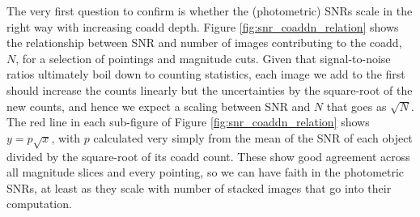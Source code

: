 \documentclass[SE,lsstdraft,authoryear,toc]{lsstdoc}
\begin{document}
The very first question to confirm is whether the (photometric) SNRs scale in the right way with increasing coadd depth.
Figure \ref{fig:snr_coaddn_relation} shows the relationship between SNR and number of images contributing to the coadd, $N$, for a selection of pointings and magnitude cuts.
Given that signal-to-noise ratios ultimately boil down to counting statistics, each image we add to the first should increase the counts linearly but the uncertainties by the square-root of the new counts, and hence we expect a scaling between SNR and $N$ that goes as $\sqrt{N}$.
The red line in each sub-figure of Figure \ref{fig:snr_coaddn_relation} shows $y = p \sqrt{x}$, with $p$ calculated very simply from the mean of the SNR of each object divided by the square-root of its coadd count.
These show good agreement across all magnitude slices and every pointing, so we can have faith in the photometric SNRs, at least as they scale with number of stacked images that go into their computation.
\end{document}
